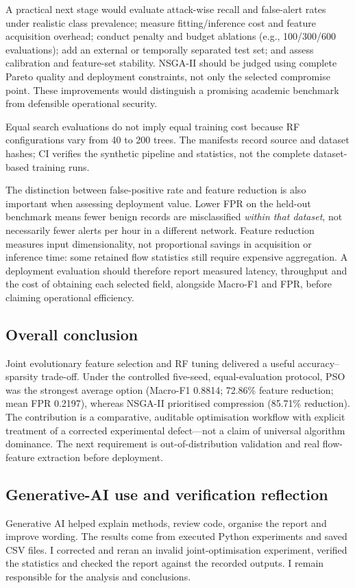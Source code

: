 \documentclass[10pt,a4paper,twocolumn]{extarticle}
\begin{document}
A practical next stage would evaluate attack-wise recall and false-alert rates under realistic class prevalence; measure fitting/inference cost and feature acquisition overhead; conduct penalty and budget ablations (e.g., 100/300/600 evaluations); add an external or temporally separated test set; and assess calibration and feature-set stability. NSGA-II should be judged using complete Pareto quality and deployment constraints, not only the selected compromise point. These improvements would distinguish a promising academic benchmark from defensible operational security.

Equal search evaluations do not imply equal training cost because RF configurations vary from 40 to 200 trees. The manifests record source and dataset hashes; CI verifies the synthetic pipeline and statistics, not the complete dataset-based training runs.


The distinction between false-positive rate and feature reduction is also important when assessing deployment value. Lower FPR on the held-out benchmark means fewer benign records are misclassified \emph{within that dataset}, not necessarily fewer alerts per hour in a different network. Feature reduction measures input dimensionality, not proportional savings in acquisition or inference time: some retained flow statistics still require expensive aggregation. A deployment evaluation should therefore report measured latency, throughput and the cost of obtaining each selected field, alongside Macro-F1 and FPR, before claiming operational efficiency.

\subsection{Overall conclusion}
Joint evolutionary feature selection and RF tuning delivered a useful accuracy--sparsity trade-off. Under the controlled five-seed, equal-evaluation protocol, PSO was the strongest average option (Macro-F1 0.8814; 72.86\% feature reduction; mean FPR 0.2197), whereas NSGA-II prioritised compression (85.71\% reduction). The contribution is a comparative, auditable optimisation workflow with explicit treatment of a corrected experimental defect---not a claim of universal algorithm dominance. The next requirement is out-of-distribution validation and real flow-feature extraction before deployment.

\subsection{Generative-AI use and verification reflection}
Generative AI helped explain methods, review code, organise the report and improve wording. The results come from executed Python experiments and saved CSV files. I corrected and reran an invalid joint-optimisation experiment, verified the statistics and checked the report against the recorded outputs. I remain responsible for the analysis and conclusions.
\end{document}
